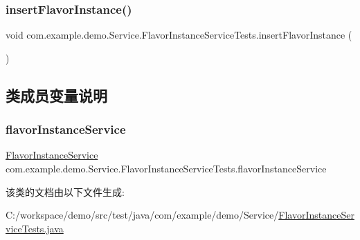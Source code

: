 \subsubsection{\texorpdfstring{insert\+Flavor\+Instance()}{insertFlavorInstance()}}
{\footnotesize\ttfamily void com.\+example.\+demo.\+Service.\+Flavor\+Instance\+Service\+Tests.\+insert\+Flavor\+Instance (\begin{DoxyParamCaption}{ }\end{DoxyParamCaption})}



\subsection{类成员变量说明}
\mbox{\label{classcom_1_1example_1_1demo_1_1_service_1_1_flavor_instance_service_tests_a6fb1dbd7053edbedcd63164466341980}} 
\subsubsection{\texorpdfstring{flavor\+Instance\+Service}{flavorInstanceService}}
{\footnotesize\ttfamily \mbox{\hyperlink{classcom_1_1example_1_1demo_1_1service_1_1_flavor_instance_service}{Flavor\+Instance\+Service}} com.\+example.\+demo.\+Service.\+Flavor\+Instance\+Service\+Tests.\+flavor\+Instance\+Service\hspace{0.3cm}{\ttfamily [package]}}



该类的文档由以下文件生成\+:\begin{DoxyCompactItemize}
\item 
C\+:/workspace/demo/src/test/java/com/example/demo/\+Service/\mbox{\hyperlink{_flavor_instance_service_tests_8java}{Flavor\+Instance\+Service\+Tests.\+java}}\end{DoxyCompactItemize}
